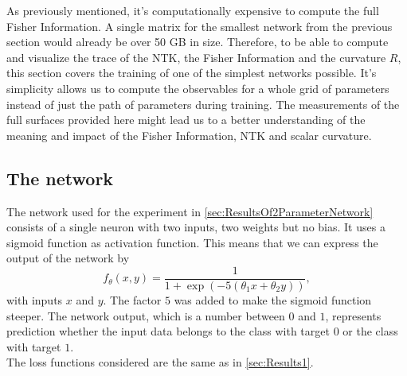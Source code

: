 As previously mentioned, it's computationally expensive to compute the full Fisher Information. A single matrix for the smallest network from the previous section would already be over 50 GB in size. Therefore, to be able to compute and visualize the trace of the NTK, the Fisher Information and the curvature $R$, this section covers the training of one of the simplest networks possible. It's simplicity allows us to compute the observables for a whole grid of parameters instead of just the path of parameters during training. The measurements of the full surfaces provided here might lead us to a better understanding of the meaning and impact of the Fisher Information, NTK and scalar curvature.

\subsection{The network}
The network used for the experiment in \cref{sec:ResultsOf2ParameterNetwork} consists of a single neuron with two inputs, two weights but no bias. It uses a sigmoid function \cite{ActivationFunctionOverview} as activation function. This means that we can express the output of the network by 
\begin{equation}\label{eq:Results2Sigmoid}
	f_\theta(x,y) = \frac{1}{1+ \exp (-5(\theta_1 x + \theta_2 y))},
\end{equation}
with inputs $x$ and $y$. The factor $5$ was added to make the sigmoid function steeper. The network output, which is a number between $0$ and $1$, represents prediction whether the input data belongs to the class with target $0$ or the class with target $1$.\\
The loss functions considered are the same as in \cref{sec:Results1}.

